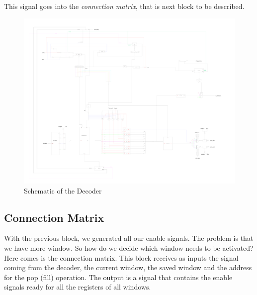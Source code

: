 \documentclass{article}
\begin{document}
This signal goes into the \emph{connection matrix}, that is next block to be described. 

\begin{figure}[h]
    \centering
    \includegraphics[width=1\textwidth]{Immagini/Decoder.pdf}
    \caption{Schematic of the Decoder}
    \label{decoder}
\end{figure}

\subsection{Connection Matrix}

With the previous block, we generated all our enable signals. The problem is that we have more window. So how do we decide which window needs to be activated? Here comes is the connection matrix. This block receives as inputs the signal coming from the decoder, the current window, the saved window and the address for the pop (fill) operation. The output is a signal that contains the enable signals ready for all the registers of all windows. 
\end{document}
